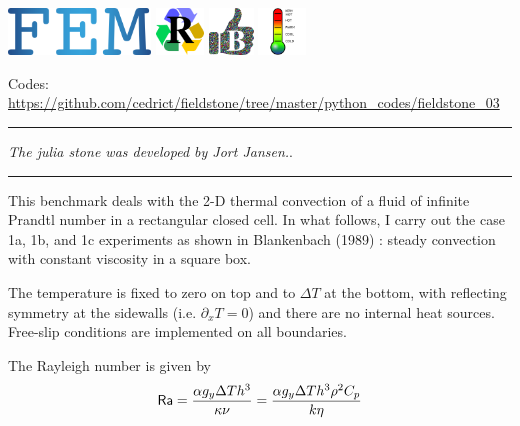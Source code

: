 \includegraphics[height=1.25cm]{images/pictograms/FEM}
\includegraphics[height=1.25cm]{images/pictograms/replication}
\includegraphics[height=1.25cm]{images/pictograms/benchmark}
\includegraphics[height=1.25cm]{images/pictograms/temperature}



\begin{center}
\inpython
\injulia
{\small Codes: \url{https://github.com/cedrict/fieldstone/tree/master/python_codes/fieldstone_03}}
\end{center}

\par\noindent\rule{\textwidth}{0.4pt}

{\sl The julia stone was developed by Jort Jansen.}. 

\par\noindent\rule{\textwidth}{0.4pt}


This benchmark deals with the 2-D thermal convection of a fluid 
of infinite Prandtl number in a rectangular closed cell.
In what follows, I carry out the case 1a, 1b, and 1c experiments as shown in 
Blankenbach \etal (1989) \cite{blbc89}:
steady convection with constant viscosity in a square box.

The temperature is fixed to zero on top and to $\Delta T$ at the bottom, 
with reflecting symmetry at the sidewalls (i.e. $\partial_x T=0$) 
and there are no internal heat sources. 
Free-slip conditions are implemented on all boundaries. 

The Rayleigh number is given by
\begin{equation}
{\mathsf{Ra}} = \frac{\alpha g_y \Delta T h^3 }{\kappa \nu}
=\frac{\alpha g_y \Delta T h^3 \rho^2 C_p}{k \eta}
\end{equation}

